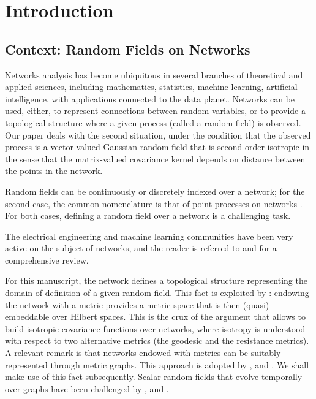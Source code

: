 \documentclass[12pt]{article}
\theoremstyle{plain}
\theoremstyle{remark}
\begin{document}
\section{Introduction}
\subsection{Context: Random Fields on Networks}
    Networks analysis has become ubiquitous in several branches of theoretical and applied sciences, including mathematics, statistics, machine learning, artificial intelligence, with applications connected to the data planet. Networks can be used, either, to represent connections between random variables, or to provide a topological structure where a given process (called a random field) is observed. Our paper deals with the second situation, under the condition that the observed process is a vector-valued Gaussian random field that is second-order isotropic in the sense that the matrix-valued covariance kernel depends on distance between the points in the network. \par
    Random fields can be continuously \citep{anderes_isotropic_2020} or discretely indexed over a network; for the second case, the common nomenclature is that of point processes on networks \citep{moradi, BADDELEY2021100435, BADDELEY}. For both cases, defining a random field over a network is a challenging task.\par
    The electrical engineering and machine learning communities have been very active on the subject of networks, and the reader is referred to {\cite{Ortega2018} and} \cite{chami2022machine} for a comprehensive review. \par
    For this manuscript, the network defines a topological structure representing the domain of definition of a given random field. This fact is exploited by \cite{anderes_isotropic_2020}: endowing the network with a metric provides a metric space that is then (quasi) embeddable over Hilbert spaces. This is the crux of the argument that allows to build isotropic covariance functions over networks, where isotropy is understood with respect to two alternative metrics (the geodesic and the resistance metrics). A relevant remark is that  networks    endowed with metrics can be {suitably} represented through metric graphs. This approach is adopted by \cite{bolin}, \cite{anderes_isotropic_2020} and \cite{bolin2022gaussian}. We shall make use of this fact subsequently. Scalar {random fields} that evolve temporally over graphs have been challenged by \cite{porcu2023stationary}, \cite{filosi2023temporally} and \cite{tang}. \par    
\end{document}
